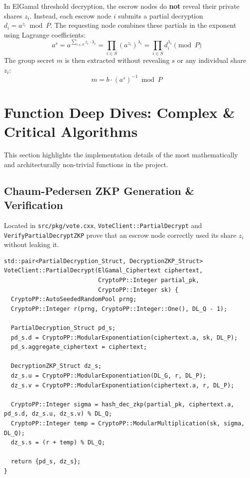 \documentclass[11pt,a4paper]{article}
\begin{document}
In ElGamal threshold decryption, the escrow nodes do \textbf{not} reveal their private shares $z_i$. Instead, each escrow node $i$ submits a partial decryption $d_i = a^{z_i} \bmod P$. The requesting node combines these partials in the exponent using Lagrange coefficients:
\[
	a^s = a^{\sum_{i \in S} z_i \cdot \lambda_i} = \prod_{i \in S} \left( a^{z_i} \right)^{\lambda_i} = \prod_{i \in S} d_i^{\lambda_i} \pmod P
\]
The group secret $m$ is then extracted without revealing $s$ or any individual share $z_i$:
\[
	m = b \cdot (a^s)^{-1} \bmod P
\]

\section{Function Deep Dives: Complex \& Critical Algorithms}
\label{sec:hard_functions}

This section highlights the implementation details of the most mathematically and architecturally non-trivial functions in the project.

\subsection{Chaum-Pedersen ZKP Generation \& Verification}
Located in \texttt{src/pkg/vote.cxx}, \texttt{VoteClient::PartialDecrypt} and \texttt{VerifyPartialDecryptZKP} prove that an escrow node correctly used its share $z_i$ without leaking it.

\begin{lstlisting}[caption={Chaum-Pedersen ZKP Generation in \texttt{VoteClient::PartialDecrypt}}]
std::pair<PartialDecryption_Struct, DecryptionZKP_Struct>
VoteClient::PartialDecrypt(ElGamal_Ciphertext ciphertext,
                           CryptoPP::Integer partial_pk,
                           CryptoPP::Integer sk) {
  CryptoPP::AutoSeededRandomPool prng;
  CryptoPP::Integer r(prng, CryptoPP::Integer::One(), DL_Q - 1);

  PartialDecryption_Struct pd_s;
  pd_s.d = CryptoPP::ModularExponentiation(ciphertext.a, sk, DL_P);
  pd_s.aggregate_ciphertext = ciphertext;

  DecryptionZKP_Struct dz_s;
  dz_s.u = CryptoPP::ModularExponentiation(DL_G, r, DL_P);
  dz_s.v = CryptoPP::ModularExponentiation(ciphertext.a, r, DL_P);

  CryptoPP::Integer sigma = hash_dec_zkp(partial_pk, ciphertext.a, pd_s.d, dz_s.u, dz_s.v) % DL_Q;
  CryptoPP::Integer temp = CryptoPP::ModularMultiplication(sk, sigma, DL_Q);
  dz_s.s = (r + temp) % DL_Q;

  return {pd_s, dz_s};
}
\end{lstlisting}
\end{document}
